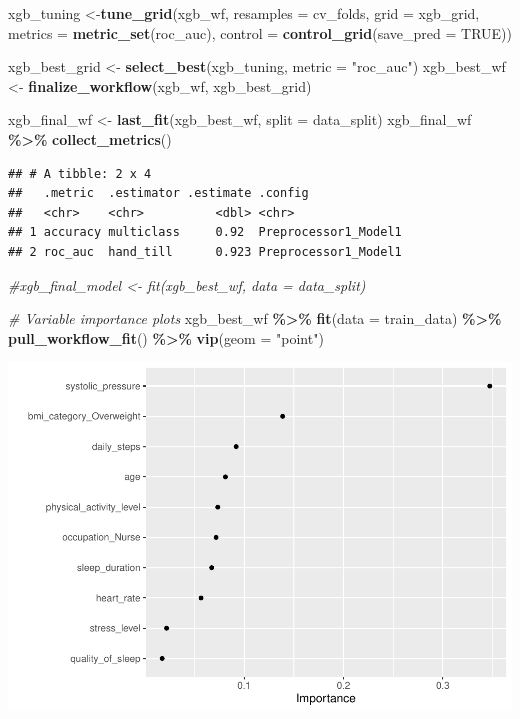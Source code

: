 \documentclass[
]{article}
\newenvironment{Shaded}{\begin{snugshade}}{\end{snugshade}}
\newcommand{\AttributeTok}[1]{\textcolor[rgb]{0.13,0.29,0.53}{#1}}
\newcommand{\CommentTok}[1]{\textcolor[rgb]{0.56,0.35,0.01}{\textit{#1}}}
\newcommand{\ConstantTok}[1]{\textcolor[rgb]{0.56,0.35,0.01}{#1}}
\newcommand{\FunctionTok}[1]{\textcolor[rgb]{0.13,0.29,0.53}{\textbf{#1}}}
\newcommand{\NormalTok}[1]{#1}
\newcommand{\OtherTok}[1]{\textcolor[rgb]{0.56,0.35,0.01}{#1}}
\newcommand{\SpecialCharTok}[1]{\textcolor[rgb]{0.81,0.36,0.00}{\textbf{#1}}}
\newcommand{\StringTok}[1]{\textcolor[rgb]{0.31,0.60,0.02}{#1}}
\begin{document}
\begin{Shaded}
\begin{Highlighting}[]
\NormalTok{xgb\_tuning }\OtherTok{\textless{}{-}}\FunctionTok{tune\_grid}\NormalTok{(xgb\_wf,}
                        \AttributeTok{resamples =}\NormalTok{ cv\_folds,}
                        \AttributeTok{grid =}\NormalTok{ xgb\_grid,}
                        \AttributeTok{metrics =} \FunctionTok{metric\_set}\NormalTok{(roc\_auc),}
                        \AttributeTok{control =} \FunctionTok{control\_grid}\NormalTok{(}\AttributeTok{save\_pred =} \ConstantTok{TRUE}\NormalTok{))}

\NormalTok{xgb\_best\_grid }\OtherTok{\textless{}{-}} \FunctionTok{select\_best}\NormalTok{(xgb\_tuning, }\AttributeTok{metric =} \StringTok{"roc\_auc"}\NormalTok{)}
\NormalTok{xgb\_best\_wf }\OtherTok{\textless{}{-}} \FunctionTok{finalize\_workflow}\NormalTok{(xgb\_wf, xgb\_best\_grid)}

\NormalTok{xgb\_final\_wf }\OtherTok{\textless{}{-}} \FunctionTok{last\_fit}\NormalTok{(xgb\_best\_wf, }\AttributeTok{split =}\NormalTok{ data\_split)}
\NormalTok{xgb\_final\_wf }\SpecialCharTok{\%\textgreater{}\%} \FunctionTok{collect\_metrics}\NormalTok{()}
\end{Highlighting}
\end{Shaded}

\begin{verbatim}
## # A tibble: 2 x 4
##   .metric  .estimator .estimate .config             
##   <chr>    <chr>          <dbl> <chr>               
## 1 accuracy multiclass     0.92  Preprocessor1_Model1
## 2 roc_auc  hand_till      0.923 Preprocessor1_Model1
\end{verbatim}

\begin{Shaded}
\begin{Highlighting}[]
\CommentTok{\#xgb\_final\_model \textless{}{-} fit(xgb\_best\_wf, data = data\_split)}

\CommentTok{\# Variable importance plots}
\NormalTok{xgb\_best\_wf }\SpecialCharTok{\%\textgreater{}\%} 
  \FunctionTok{fit}\NormalTok{(}\AttributeTok{data =}\NormalTok{ train\_data) }\SpecialCharTok{\%\textgreater{}\%} 
  \FunctionTok{pull\_workflow\_fit}\NormalTok{() }\SpecialCharTok{\%\textgreater{}\%} 
  \FunctionTok{vip}\NormalTok{(}\AttributeTok{geom =} \StringTok{"point"}\NormalTok{)}
\end{Highlighting}
\end{Shaded}

\begin{center}\includegraphics[width=0.6\linewidth]{projeto_files/figure-latex/pt. 4 -1} \end{center}
\end{document}
